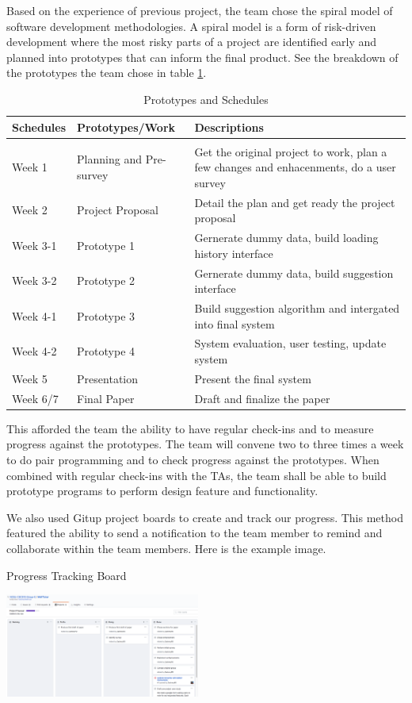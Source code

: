 Based on the experience of previous project, the team chose the spiral model of software development methodologies. A spiral model is a form of risk-driven development where the most risky parts of a project are identified early and planned into prototypes that can inform the final product. See the breakdown of the prototypes the team chose in table \ref{sec:progress:prototypes-table}.

\begin{table}[!htbp]
\caption{Prototypes and Schedules}
\label{sec:progress:prototypes-table}
\begin{center}
\begin{tabular}{  l  l p{10cm} }
	\bf Schedules & \bf Prototypes/Work & \bf Descriptions\\ \hline \\
	Week 1 & Planning and Pre-survey & Get the original project to work, plan a few changes and enhacenments, do a user survey\\
	Week 2 & Project Proposal & Detail the plan and get ready the project proposal\\
	Week 3-1 & Prototype 1 & Gernerate dummy data, build loading history interface\\
	Week 3-2 & Prototype 2 & Gernerate dummy data, build suggestion interface\\
	Week 4-1 & Prototype 3 & Build suggestion algorithm and intergated into final system \\
	Week 4-2 & Prototype 4 & System evaluation, user testing, update system \\
	Week 5 & Presentation & Present the final system \\
	Week 6/7 & Final Paper & Draft and finalize the paper \\
\end{tabular}
\end{center}
\end{table}


This afforded the team the ability to have regular check-ins and to measure
 progress against the prototypes. The team will convene two to three times 
 a week to do pair programming and to check progress against the prototypes.
  When combined with regular check-ins with the TAs, the team shall be able 
  to build prototype programs to perform design feature and functionality.

We also used Gitup project boards to create and track our progress. This method featured the ability to send a notification to the team member to remind and collaborate within the team members. Here is the example image.

\begin{table}[ht]
\caption{Progress Tracking Board}
\label{section:progress:tracking-board}
\centering
\includegraphics[width=0.48\textwidth]{progress_tracking.png}
\end{table}